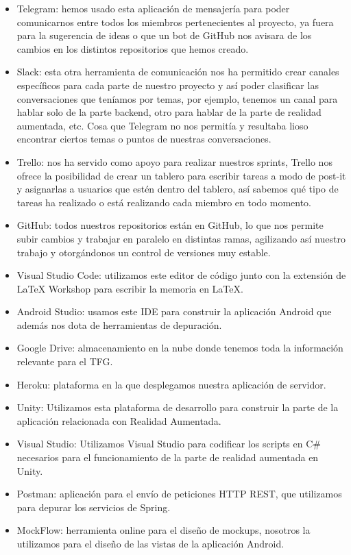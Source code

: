 \begin{itemize}
    \item Telegram: hemos usado esta aplicación de mensajería para poder comunicarnos entre todos los miembros pertenecientes al proyecto, ya fuera para la sugerencia de ideas o que un bot de GitHub nos avisara de los cambios en los distintos repositorios que hemos creado. 
    \item Slack: esta otra herramienta de comunicación nos ha permitido crear canales específicos para cada parte de nuestro proyecto y así poder clasificar las conversaciones que teníamos por temas, por ejemplo, tenemos un canal para hablar solo de la parte backend, otro para hablar de la parte de realidad aumentada, etc. Cosa que Telegram no nos permitía y resultaba lioso encontrar ciertos temas o puntos de nuestras conversaciones. 
    \item Trello: nos ha servido como apoyo para realizar nuestros sprints, Trello nos ofrece la posibilidad de crear un tablero para escribir tareas a modo de post-it y asignarlas a usuarios que estén dentro del tablero, así sabemos qué tipo de tareas ha realizado o está realizando cada miembro en todo momento.
    \item GitHub: todos nuestros repositorios están en GitHub, lo que nos permite subir cambios y trabajar en paralelo en distintas ramas, agilizando así nuestro trabajo y otorgándonos un control de versiones muy estable.
    \item Visual Studio Code: utilizamos este editor de código junto con la extensión de LaTeX Workshop para escribir la memoria en LaTeX.
    \item Android Studio: usamos este IDE para construir la aplicación Android que además nos dota de herramientas de depuración.
    \item Google Drive: almacenamiento en la nube donde tenemos toda la información relevante para el TFG.
    \item Heroku: plataforma en la que desplegamos nuestra aplicación de servidor.
    \item Unity: Utilizamos esta plataforma de desarrollo para construir la parte de la aplicación relacionada con Realidad Aumentada.
    \item Visual Studio: Utilizamos Visual Studio para codificar los scripts en C\# necesarios para el funcionamiento de la parte de realidad aumentada en Unity.
    \item Postman: aplicación para el envío de peticiones HTTP REST, que utilizamos para depurar los servicios de Spring.
    \item MockFlow: herramienta online para el diseño de mockups, nosotros la utilizamos para el diseño de las vistas de la aplicación Android.
\end{itemize}

